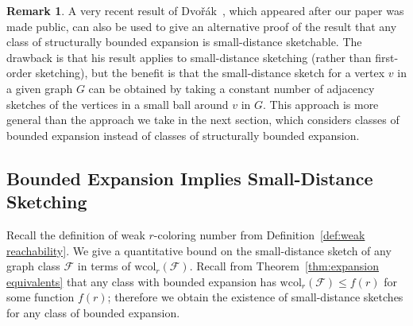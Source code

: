 \documentclass[11pt]{article}
\theoremstyle{definition}
\newtheorem{rem}[thm]{Remark}
\newcommand{\wcol}{\mathrm{wcol}}
\renewcommand{\leq}{\leqslant}
\begin{document}
\medskip

\begin{rem}
 A very recent result of Dvo\v r\'ak~\cite[Corollary
9]{Dvo22}, which appeared after our paper was made public, can also be
used to give an alternative proof of the result that any class of structurally
bounded expansion is small-distance sketchable. The drawback is that
his result applies to small-distance sketching (rather than
first-order sketching), but the benefit is that the small-distance
sketch for a vertex $v$ in a given graph $G$ can be
obtained by taking a constant number of adjacency sketches of the
vertices in a small ball around $v$ in $G$. This approach is more
general than the approach we take in the next section, which considers
classes of bounded expansion instead of classes of structurally
bounded expansion.
\end{rem}

\subsection{Bounded Expansion Implies Small-Distance Sketching}
\label{section:small-distance upper bounds}

Recall the definition of weak $r$-coloring number from Definition~\ref{def:weak reachability}. We give a
quantitative bound on the small-distance sketch of any graph class $\mathcal F$ in terms of
$\wcol_r(\mathcal F)$. Recall from Theorem~\ref{thm:expansion equivalents} that any class with
bounded expansion has $\wcol_r(\mathcal F) \leq f(r)$ for some function $f(r)$; therefore we obtain
the existence of small-distance sketches for any class of bounded expansion.
\end{document}
